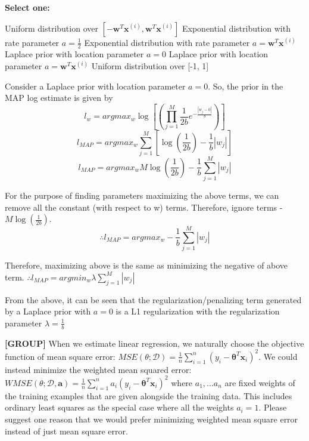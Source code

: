 \documentclass[11pt,addpoints,answers]{exam}
\newcommand{\Dc}{\mathcal{D}}
\newcommand{\av}{\mathbf{a}}
\newcommand{\group}{\textbf{[GROUP]} }
\begin{document}
\begin{questions}
    \textbf{Select one:}
    \begin{checkboxes}
        \choice Uniform distribution over $[- \mathbf{w}^T\mathbf{x}^{(i)}, \mathbf{w}^T\mathbf{x}^{(i)} ]$
        \choice Exponential distribution with rate parameter $a = \frac{1}{2}$
        \choice Exponential distribution with rate parameter $a = \mathbf{w}^T \mathbf{x}^{(i)}$
        \CorrectChoice Laplace prior with location parameter $a = 0$
        \choice Laplace prior with location parameter $a = \mathbf{w}^T \mathbf{x}^{(i)}$
        \choice Uniform distribution over [-1, 1]
    \end{checkboxes}
    
    
    \begin{your_solution}[title=Your answer,height=13cm,width=15cm]
        \vspace{-5pt}
        Consider a Laplace prior with location parameter $a = 0$. So, the prior in the MAP log estimate is given by
        \[l_{w} = argmax_w \log\left[\left(\prod\limits_{j=1}^M \frac{1}{2b}e^{-\frac{|w_j - 0|}{b}}\right)\right]\]
        \[l_{MAP} = argmax_w \sum \limits_{j = 1}^M \left[\log(\frac{1}{2b}) - \frac{1}{b}|w_j|\right]\]
        \[l_{MAP} = argmax_w M\log(\frac{1}{2b}) - \frac{1}{b}\sum \limits_{j = 1}^M |w_j|\]
        
        For the purpose of finding parameters maximizing the above terms, we can remove all the constant (with respect to w) terms. Therefore, ignore terms - $M\log(\frac{1}{2b})$.
        \[\therefore l_{MAP} = argmax_w - \frac{1}{b}\sum \limits_{j = 1}^M |w_j|\]
        
        Therefore, maximizing above is the same as minimizing the negative of above term.\newline
        $\therefore l_{MAP} = argmin_w \lambda\sum \limits_{j = 1}^M |w_j|$
        
        From the above, it can be seen that the regularization/penalizing term generated by a Laplace prior with $a = 0$ is a L1 regularization with the regularization parameter $\lambda = \frac{1}{b}$   
         \end{your_solution}
    
    \question[2]\group When we estimate linear regression, we naturally choose the objective function of mean square error: 
    $MSE(\theta; \Dc)=\frac{1}{n} \sum_{i=1}^n (y_i - \mathbf{\theta}^T\mathbf{x}_i)^2$.
    We could instead minimize the weighted mean squared error: $WMSE(\theta; \Dc, \av)=\frac{1}{n} \sum_{i=1}^n a_i(y_i - \mathbf{\theta}^T\mathbf{x}_i)^2$ where $a_1, ... a_n$ are fixed weights of the training examples that are given alongside the training data. This includes ordinary least squares as the special case where all the weights $a_i=1$. Please suggest one reason that we would prefer minimizing weighted mean square error instead of just mean square error.
    

\end{questions}
\end{document}
